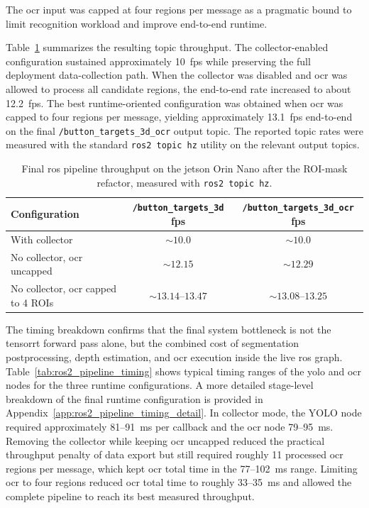 The \gls{ocr} input was capped at four regions per message as a pragmatic bound to limit
recognition workload and improve end-to-end runtime.

Table~\ref{tab:ros2_pipeline_fps} summarizes the resulting topic throughput. The
collector-enabled configuration sustained approximately 10~\gls{fps} while preserving
the full deployment data-collection path. When the collector was disabled and \gls{ocr}
was allowed to process all candidate regions, the end-to-end rate increased to
about 12.2~\gls{fps}. The best runtime-oriented configuration was obtained when \gls{ocr}
was capped to four regions per message, yielding approximately 13.1~\gls{fps}
end-to-end on the final \texttt{/button\_targets\_3d\_ocr} output topic. The
reported topic rates were measured with the standard \texttt{ros2 topic hz}
utility on the relevant output topics.

\begin{table}[htbp]
    \centering
    \caption{Final \gls{ros} pipeline throughput on the \gls{jetson} Orin Nano after the ROI-mask refactor, measured with \texttt{ros2 topic hz}.}
    \label{tab:ros2_pipeline_fps}
    \small
    \begin{tabular}{lcc}
        \toprule
        Configuration & \texttt{/button\_targets\_3d} \gls{fps} & \texttt{/button\_targets\_3d\_ocr} \gls{fps} \\
        \midrule
        With collector & $\sim 10.0$ & $\sim 10.0$ \\
        No collector, \gls{ocr} uncapped & $\sim 12.15$ & $\sim 12.29$ \\
        No collector, \gls{ocr} capped to 4 ROIs & $\sim 13.14$--$13.47$ & $\sim 13.08$--$13.25$ \\
        \bottomrule
    \end{tabular}
\end{table}

The timing breakdown confirms that the final system bottleneck is not the \gls{tensorrt}
forward pass alone, but the combined cost of segmentation postprocessing, depth
estimation, and \gls{ocr} execution inside the live \gls{ros} graph. Table~\ref{tab:ros2_pipeline_timing}
shows typical timing ranges of the \gls{yolo} and \gls{ocr} nodes for the three runtime
configurations. A more detailed stage-level breakdown of the final runtime configuration is
provided in Appendix~\ref{app:ros2_pipeline_timing_detail}. In collector mode, the YOLO node required approximately
81--91~ms per callback and the \gls{ocr} node 79--95~ms. Removing the collector while
keeping \gls{ocr} uncapped reduced the practical throughput penalty of data export but
still required roughly 11 processed \gls{ocr} regions per message, which kept \gls{ocr} total
time in the 77--102~ms range. Limiting \gls{ocr} to four regions reduced \gls{ocr} total time
to roughly 33--35~ms and allowed the complete pipeline to reach its best measured
throughput.

